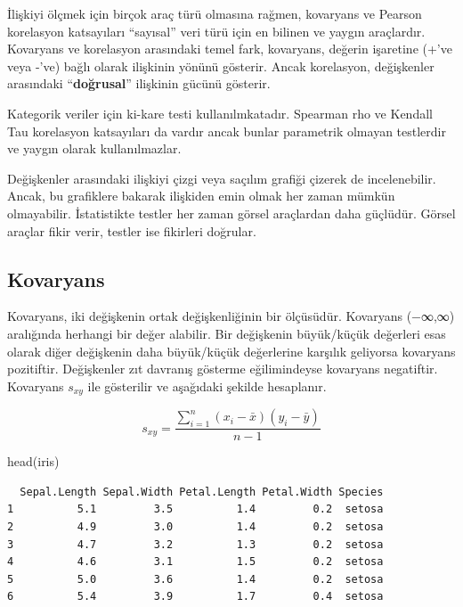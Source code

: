 \documentclass[
  letterpaper,
  DIV=11,
  numbers=noendperiod]{scrreprt}
\newenvironment{Shaded}{\begin{snugshade}}{\end{snugshade}}
\newcommand{\FunctionTok}[1]{\textcolor[rgb]{0.28,0.35,0.67}{#1}}
\newcommand{\NormalTok}[1]{\textcolor[rgb]{0.00,0.23,0.31}{#1}}
\begin{document}
İlişkiyi ölçmek için birçok araç türü olmasına rağmen, kovaryans ve
Pearson korelasyon katsayıları ``sayısal'' veri türü için en bilinen ve
yaygın araçlardır. Kovaryans ve korelasyon arasındaki temel fark,
kovaryans, değerin işaretine (+'ve veya -'ve) bağlı olarak ilişkinin
yönünü gösterir. Ancak korelasyon, değişkenler arasındaki
``\textbf{doğrusal}'' ilişkinin gücünü gösterir.

Kategorik veriler için ki-kare testi kullanılmkatadır. Spearman rho ve
Kendall Tau korelasyon katsayıları da vardır ancak bunlar parametrik
olmayan testlerdir ve yaygın olarak kullanılmazlar.

Değişkenler arasındaki ilişkiyi çizgi veya saçılım grafiği çizerek de
incelenebilir. Ancak, bu grafiklere bakarak ilişkiden emin olmak her
zaman mümkün olmayabilir. İstatistikte testler her zaman görsel
araçlardan daha güçlüdür. Görsel araçlar fikir verir, testler ise
fikirleri doğrular.

\subsection*{Kovaryans}\label{kovaryans}

Kovaryans, iki değişkenin ortak değişkenliğinin bir ölçüsüdür. Kovaryans
(−∞,∞) aralığında herhangi bir değer alabilir. Bir değişkenin
büyük/küçük değerleri esas olarak diğer değişkenin daha büyük/küçük
değerlerine karşılık geliyorsa kovaryans pozitiftir. Değişkenler zıt
davranış gösterme eğilimindeyse kovaryans negatiftir. Kovaryans
\(s_{xy}\) ile gösterilir ve aşağıdaki şekilde hesaplanır.

\[{s}_{xy} = \frac{\sum_{i=1}^n(x_i - \bar{x})(y_i - \bar{y})}{n-1}\]

\begin{Shaded}
\begin{Highlighting}[]
\FunctionTok{head}\NormalTok{(iris)}
\end{Highlighting}
\end{Shaded}

\begin{verbatim}
  Sepal.Length Sepal.Width Petal.Length Petal.Width Species
1          5.1         3.5          1.4         0.2  setosa
2          4.9         3.0          1.4         0.2  setosa
3          4.7         3.2          1.3         0.2  setosa
4          4.6         3.1          1.5         0.2  setosa
5          5.0         3.6          1.4         0.2  setosa
6          5.4         3.9          1.7         0.4  setosa
\end{verbatim}
\end{document}
